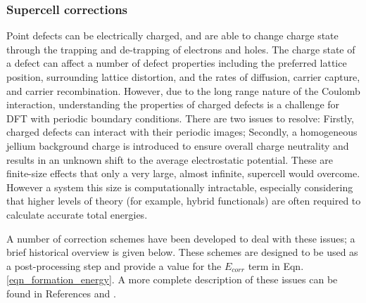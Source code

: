 
\subsubsection{Supercell corrections} \label{corrections}
Point defects can be electrically charged, and are able to change charge state through the trapping and de-trapping of electrons and holes. 
The charge state of a defect can affect a number of defect properties including the preferred lattice position, surrounding lattice distortion, and the rates of diffusion, carrier capture, and carrier recombination.
However, due to the long range nature of the Coulomb interaction, understanding the properties of charged defects is a challenge for DFT with periodic boundary conditions.
There are two issues to resolve: 
Firstly, charged defects can interact with their periodic images; 
Secondly, a homogeneous jellium background charge is introduced to ensure overall charge neutrality and results in an unknown shift to the average electrostatic potential. 
These are finite-size effects that only a very large, almost infinite, supercell would overcome.
However a system this size is computationally intractable, especially considering that higher levels of theory (for example, hybrid functionals) are often required to calculate accurate total energies.

A number of correction schemes have been developed to deal with these issues; a brief historical overview is given below. These schemes are designed to be used as a post-processing step and provide a value for the $E_{corr}$ term in Eqn.\ref{eqn_formation_energy}. A more complete description of these issues can be found in References \cite{durrant2018} and \cite{Vinichenko2017}.


